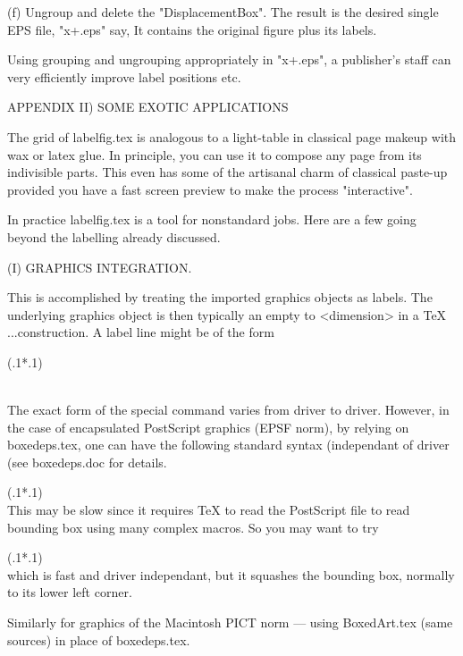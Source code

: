  (f)  Ungroup and delete the "DisplacementBox".  The result is the
desired single EPS file, "x+.eps" say, It contains the original figure
plus its labels.  

     Using grouping and ungrouping appropriately in "x+.eps", a
publisher's staff can very efficiently improve label positions etc.



APPENDIX II)  SOME EXOTIC APPLICATIONS

     The grid of labelfig.tex is analogous to a light-table in
classical page makeup with wax or latex glue.  In principle, you
can use it to compose any page from its indivisible parts.  This
even has some of the artisanal charm of classical paste-up
provided you have a fast screen preview to make the process
"interactive".

     In practice labelfig.tex is a tool for nonstandard jobs.
Here are a few going beyond the labelling already discussed.



(I)  GRAPHICS INTEGRATION.

     This is accomplished by treating the imported graphics
objects as labels.  The underlying graphics object is then
typically an empty  \vbox to <dimension>{\vfill} in a TeX
\midinsert...\endinsert construction.  A label line
might be of the form

   (.1*.1) \\

The exact form of the special command varies from driver to
driver.  However, in the case of encapsulated PostScript graphics
(EPSF norm), by relying on boxedeps.tex, one can have the
following standard syntax (independant of driver  (see
boxedeps.doc for details.
  
  (.1*.1) \\

This may be slow since it requires TeX to read the PostScript
file to read bounding box using many complex macros.  So you
may want to try

  (.1*.1) \\

which is fast and driver independant, but it squashes the
bounding box, normally to its lower left corner.

     Similarly for graphics of the Macintosh PICT norm ---
using BoxedArt.tex (same sources) in place of boxedeps.tex.

